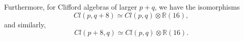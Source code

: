\documentclass[letterpaper,12pt,titlepage,oneside,final]{book}
\newcommand{\R}{\mathbb{R}}
\newcommand{\C}{\mathbb{C}}
\newcommand{\h}{\mathbb{H}}
\begin{document}



\vspace{6mm}

\noindent Furthermore, for  Clifford algebras of larger $p+q$, we have the isomorphisms
\begin{equation} Cl(p,q+8)\simeq Cl(p,q)\otimes\R(16), 
\end{equation}
\noindent and similarly, 
\begin{equation}Cl(p+8,q)\simeq Cl(p,q)\otimes\R(16).
\end{equation}
\end{document}
